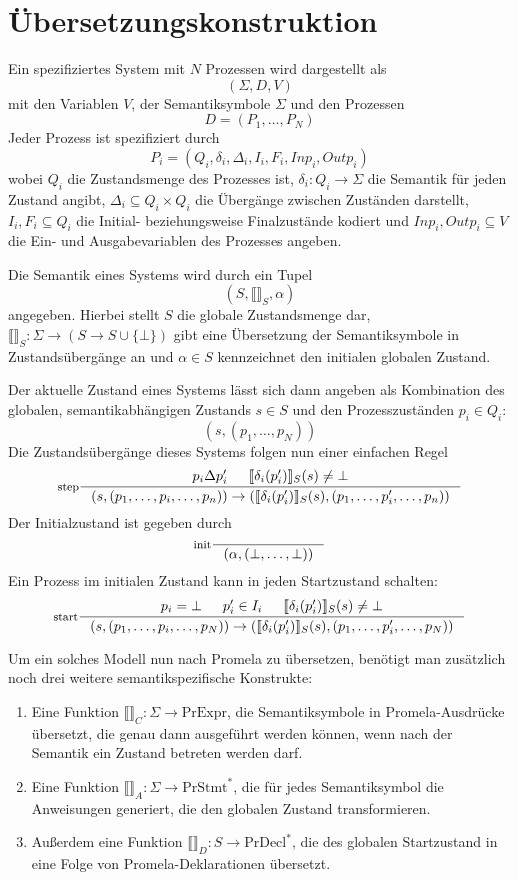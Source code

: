 \section{Übersetzungskonstruktion}
Ein spezifiziertes System mit $N$ Prozessen wird dargestellt als
\[ (\Sigma,D,V) \]
mit den Variablen $V$, der Semantiksymbole $\Sigma$ und den Prozessen
\[ D = (P_1,\dots,P_N) \]
Jeder Prozess ist spezifiziert durch
\[ P_i = (Q_i,\delta_i,\Delta_i,I_i,F_i,Inp_i,Outp_i) \]
wobei $Q_i$ die Zustandsmenge des Prozesses ist, $\delta_i: Q_i\rightarrow \Sigma$ die Semantik für jeden Zustand angibt, $\Delta_i\subseteq Q_i\times Q_i$ die Übergänge zwischen Zuständen darstellt, $I_i,F_i\subseteq Q_i$ die Initial- beziehungsweise Finalzustände kodiert und $Inp_i,Outp_i\subseteq V$ die Ein- und Ausgabevariablen des Prozesses angeben.

Die Semantik eines Systems wird durch ein Tupel
\[ (S,\llbracket \rrbracket_S,\alpha) \]
angegeben.
Hierbei stellt $S$ die globale Zustandsmenge dar, $\llbracket \rrbracket_S:\Sigma\rightarrow (S\rightarrow S\cup \{\bot\})$ gibt eine Übersetzung der Semantiksymbole in Zustandsübergänge an und $\alpha\in S$ kennzeichnet den initialen globalen Zustand.

Der aktuelle Zustand eines Systems lässt sich dann angeben als Kombination des globalen, semantikabhängigen Zustands $s\in S$ und den Prozesszuständen $p_i\in Q_i$:
\[ (s,(p_1,\dots,p_N)) \]
Die Zustandsübergänge dieses Systems folgen nun einer einfachen Regel
\[ \inference[step]{p_i\Delta p_i'&\llbracket \delta_i(p_i')\rrbracket_S(s)\neq\bot}{(s,(p_1,\dots,p_i,\dots,p_n))\rightarrow (\llbracket\delta_i(p_i')\rrbracket_S(s),(p_1,\dots,p_i',\dots,p_n))} \]
Der Initialzustand ist gegeben durch
\[ \inference[init]{}{(\alpha,(\bot,\dots,\bot))} \]
Ein Prozess im initialen Zustand kann in jeden Startzustand schalten:
\[ \inference[start]{p_i=\bot&p_i'\in I_i&\llbracket \delta_i(p_i')\rrbracket_S(s)\neq\bot}{(s,(p_1,\dots,p_i,\dots,p_N))\rightarrow (\llbracket \delta_i(p_i')\rrbracket_S(s),(p_1,\dots,p_i',\dots,p_N))} \]

Um ein solches Modell nun nach Promela zu übersetzen, benötigt man zusätzlich noch drei weitere semantikspezifische Konstrukte:
\begin{enumerate}
\item Eine Funktion $\llbracket\rrbracket_C : \Sigma\rightarrow \textrm{PrExpr}$, die Semantiksymbole in Promela-Ausdrücke übersetzt, die genau dann ausgeführt werden können, wenn nach der Semantik ein Zustand betreten werden darf.
\item Eine Funktion $\llbracket\rrbracket_A : \Sigma\rightarrow \textrm{PrStmt}^{*}$, die für jedes Semantiksymbol die Anweisungen generiert, die den globalen Zustand transformieren.
\item Außerdem eine Funktion $\llbracket\rrbracket_D : S\rightarrow \textrm{PrDecl}^{*}$, die des globalen Startzustand in eine Folge von Promela-Deklarationen übersetzt.
\end{enumerate}

